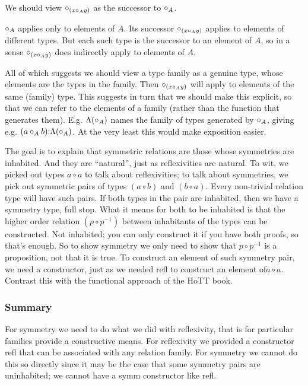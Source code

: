 \documentclass{article}
\begin{document}
We should view \(\circ_{(x\circ_Ay)}\) as the successor to \(\circ_A\).

\(\circ_A\) applies only to elements of \(A\).  Its successor
\(\circ_{(x\circ_Ay)}\) applies to elements of different types.  But each such
type is the successor to an element of \(A\), so in a sense
\(\circ_{(x\circ_Ay)}\) does indirectly apply to elements of \(A\).

\begin{remark}
All of which suggests we should view a type family as a genuine type,
whose elements are the types in the family.  Then \(\circ_{(x\circ_Ay)}\) will
apply to elements of the same (family) type.  This suggests in turn
that we should make this explicit, so that we can refer to the
elements of a family (rather than the function that generates them).
E.g. \(\Lambda(\circ_A)\) names the family of types generated by
\(\circ_A\), giving e.g. \((a\circ_A b){:}\Lambda(\circ_A)\).  At the very
least this would make exposition easier.
\end{remark}


\begin{remark}
The goal is to explain that symmetric relations are those whose
symmetries are inhabited.  And they are ``natural'', just as
reflexivities are natural.  To wit, we picked out types \(a\circ a\)
to talk about reflexivities; to talk about symmetries, we pick out
symmetric pairs of types \((a\circ b)\) and \((b\circ a)\).  Every
non-trivial relation type will have such pairs.  If both types in the
pair are inhabited, then we have a symmetry type, full stop.  What it
means for both to be inhabited is that the higher order relation
\((p\circ p^{-1})\) between inhabitants of the types can be
constructed.  Not inhabited; you can only construct it if you have
both proofs, so that's enough.  So to show symmetry we only need to
show that \(p\circ p^{-1}\) is a proposition, not that it is true.  To
construct an element of such symmetry pair, we need a constructor,
just as we needed refl to construct an element of\(a\circ a\).
Contrast this with the functional approach of the HoTT book.
\end{remark}

\subsubsection{Summary}

For symmetry we need to do what we did with reflexivity, that is for
particular families provide a constructive means.  For reflexivity we
provided a constructor refl that can be associated with any relation
family.  For symmetry we cannot do this so directly since it may be
the case that some symmetry pairs are uninhabited; we cannot have a
symm constructor like refl.
\end{document}
